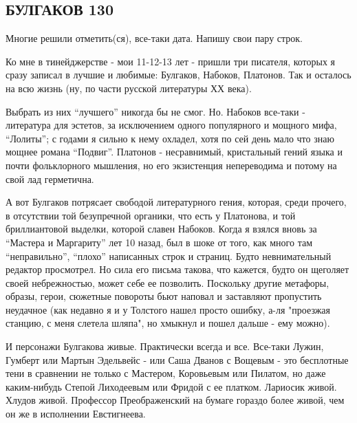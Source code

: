  
 
 
 
 

\subsection{БУЛГАКОВ 130}

Многие решили отметить(ся), все-таки дата. Напишу свои пару строк. 

Ко мне в тинейджерстве - мои 11-12-13 лет - пришли три писателя, которых я
сразу записал в лучшие и любимые: Булгаков, Набоков, Платонов. Так и осталось
на всю жизнь (ну, по части русской литературы ХХ века). 

Выбрать из них \enquote{лучшего} никогда бы не смог. Но. Набоков все-таки - литература
для эстетов, за исключением одного популярного и мощного мифа, \enquote{Лолиты}; с
годами я сильно к нему охладел, хотя по сей день мало что знаю мощнее романа
\enquote{Подвиг}. Платонов - несравнимый, кристальный гений языка и почти фольклорного
мышления, но его экзистенция непереводима и потому на свой лад герметична. 

А вот Булгаков потрясает свободой литературного гения, которая, среди прочего,
в отсутствии той безупречной органики, что есть у Платонова, и той
бриллиантовой выделки, которой славен Набоков. Когда я взялся вновь за \enquote{Мастера
и Маргариту} лет 10 назад, был в шоке от того, как много там \enquote{неправильно},
\enquote{плохо} написанных строк и страниц. Будто невнимательный редактор просмотрел.
Но сила его письма такова, что кажется, будто он щеголяет своей небрежностью,
может себе ее позволить. Поскольку другие метафоры, образы, герои, сюжетные
повороты бьют наповал и заставляют пропустить неудачное (как недавно я и у
Толстого нашел просто ошибку, а-ля "проезжая станцию, с меня слетела шляпа", но
хмыкнул и пошел дальше - ему можно).

И персонажи Булгакова живые. Практически всегда и все. Все-таки Лужин, Гумберт
или Мартын Эдельвейс - или Саша Дванов с Вощевым - это бесплотные тени в
сравнении не только с Мастером, Коровьевым или Пилатом, но даже каким-нибудь
Степой Лиходеевым или Фридой с ее платком. Лариосик живой. Хлудов живой.
Профессор Преображенский на бумаге гораздо более живой, чем он же в исполнении
Евстигнеева. 

